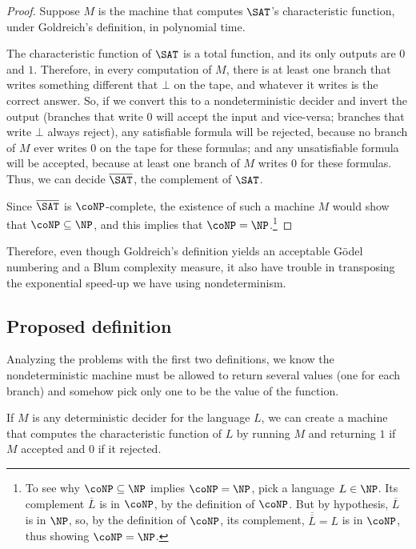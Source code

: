 \documentclass[12pt]{article}
\theoremstyle{definition}
\begin{document}
\begin{proof}
    Suppose $M$ is the machine that computes $\SAT$'s characteristic function,
    under Goldreich's definition, in polynomial time.

    The characteristic function of $\SAT$ is a total function,
    and its only outputs are $0$ and $1$.
    Therefore, in every computation of $M$,
    there is at least one branch that writes something different that $\bot$ on the tape,
    and whatever it writes is the correct answer.
    So, if we convert this to a nondeterministic decider and invert the output
    (branches that write $0$ will accept the input and vice-versa;
    branches that write $\bot$ always reject),
    any satisfiable formula will be rejected,
    because no branch of $M$ ever writes $0$ on the tape for these formulas;
    and any unsatisfiable formula will be accepted,
    because at least one branch of $M$ writes $0$ for these formulas.
    Thus, we can decide $\overline \SAT$, the complement of $\SAT$.

    Since $\overline \SAT$ is $\coNP$-complete,
    the existence of such a machine $M$
    would show that $\coNP \subseteq \NP$,
    and this implies that $\coNP = \NP$.\footnote{
        To see why $\coNP \subseteq \NP$ implies $\coNP = \NP$,
        pick a language $L \in \NP$.
        Its complement $\overline L$ is in $\coNP$, by the definition of $\coNP$.
        But by hypothesis, $\overline L$ is in $\NP$,
        so, by the definition of $\coNP$,
        its complement, $\overline{\overline L} = L$ is in $\coNP$,
        thus showing $\coNP = \NP$.
    }
\end{proof}

Therefore, even though Goldreich's definition
yields an acceptable Gödel numbering and a Blum complexity measure,
it also have trouble in transposing the exponential speed-up
we have using nondeterminism.

\subsection{Proposed definition}
\label{sec:proposed}

Analyzing the problems with the first two definitions,
we know the nondeterministic machine must be allowed to return several values
(one for each branch)
and somehow pick only one to be the value of the function.

If $M$ is any deterministic decider for the language $L$,
we can create a machine that computes the characteristic function of $L$
by running $M$ and returning $1$ if $M$ accepted and $0$ if it rejected.
\end{document}
